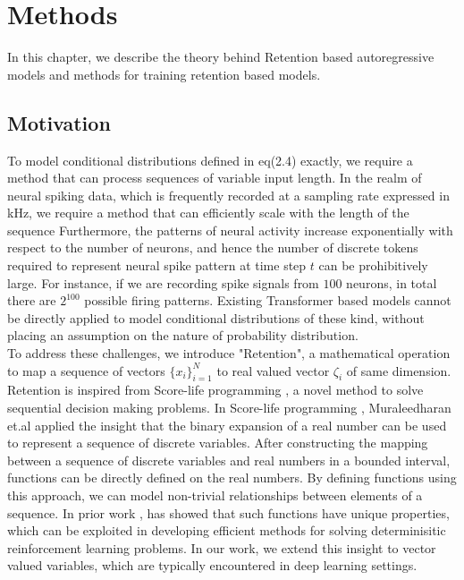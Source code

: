 \chapter{Methods}\label{ch:methods}
In this chapter, we describe the theory behind Retention based autoregressive models and methods for training retention based models. 
\section{Motivation}

To model conditional distributions defined in eq(2.4) exactly, we require a method that can process sequences of variable input length. In the realm of neural spiking data, which is frequently recorded at a sampling rate expressed in kHz, we require a method that can efficiently scale with the length of the sequence Furthermore, the patterns of neural activity increase exponentially with respect to the number of neurons, and hence the number of discrete tokens required to represent neural spike pattern at time step $t$ can be prohibitively large. For instance, if we are recording spike signals from $100$ neurons, in total there are $2^{100}$ possible firing patterns. Existing Transformer based models cannot be directly applied to model conditional distributions of these kind, without placing an assumption on the nature of probability distribution. \\

To address these challenges, we introduce "Retention", a mathematical operation to map a sequence of vectors $\{x_i\}_{i=1}^N$ to real valued vector $\zeta_i$ of same dimension. Retention is inspired from Score-life programming \cite{muraleedharan2023beyond}, a novel method to solve sequential decision making problems. In Score-life programming \cite{muraleedharan2023beyond}, Muraleedharan et.al applied the insight that the binary expansion of a real number can be used to represent a sequence of discrete variables. After constructing the mapping between a sequence of discrete variables and real numbers in a bounded interval, functions can be directly defined on the real numbers. By defining functions using this approach, we can model non-trivial relationships between elements of a sequence. In prior work \cite{muraleedharan2023beyond}, has showed that such functions have unique properties, which can be exploited in developing efficient methods for solving determinisitic reinforcement learning problems. In our work, we extend this insight to vector valued variables, which are typically encountered in deep learning settings. 

